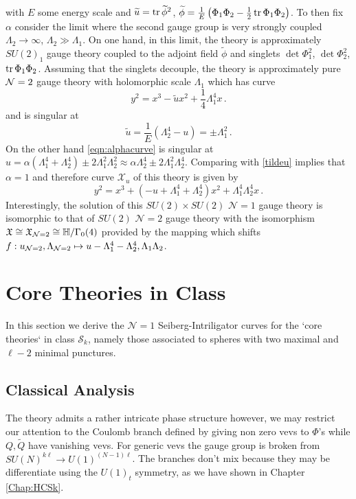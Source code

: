 \documentclass[main.tex]{subfiles}
\begin{document}
with $E$ some energy scale and $\widetilde{u}=\operatorname{tr}\widetilde{\phi}^2$, $\widetilde{\phi}=\frac{1}{E}\left(\Phi_1\Phi_2-\frac{1}{2}\operatorname{tr}\Phi_1\Phi_2\right)$. 
To then fix $\alpha$ consider the limit where the second gauge group is very strongly coupled $\Lambda_2\to\infty$, $\Lambda_2\gg\Lambda_1$. On one hand, in this limit, the theory is approximately $SU(2)_1$ gauge theory coupled to the adjoint field $\widetilde{\phi}$ and singlets $\det\Phi_1^2$, $\det\Phi_2^2$, $\operatorname{tr}\Phi_1\Phi_2$. Assuming that the singlets decouple, the theory is approximately pure $\mathcal{N}=2$ gauge theory with holomorphic scale $\Lambda_1$ which has curve
\begin{equation}
y^2=x^3-\widetilde{u}x^2+\frac{1}{4}\Lambda_1^4x\,.
\end{equation} 
and is singular at 
\begin{equation}\label{tildeu}
\widetilde{u}=\frac{1}{E}\left(\Lambda_2^4-u\right)=\pm\Lambda_1^2\,.
\end{equation}
On the other hand \eqref{eqn:alphacurve} is singular at $u=\alpha\left(\Lambda_1^4+\Lambda_2^4\right)\pm2\Lambda_1^2\Lambda_2^2\approx\alpha\Lambda_2^4\pm2\Lambda_1^2\Lambda_2^4$. Comparing with \eqref{tildeu} implies that $\alpha=1$ and therefore curve $\mathcal{X}_u$ of this theory is given by
\begin{equation}\label{eqn:SIcurve}
y^2=x^3+(-u+\Lambda^4_1+\Lambda^4_2)x^2+\Lambda^4_1\Lambda^4_2x\,.
\end{equation}
Interestingly, the solution of this $SU(2)\times SU(2)$ $\mathcal{N}=1$ gauge theory is isomorphic to that of $SU(2)$ $\mathcal{N}=2$ gauge theory with the isomorphism $\mathfrak{X}\cong\mathfrak{X}_{\mathcal{N}=2}\cong \mathbb{H}/\Gamma_0(4)$ provided by the mapping which shifts $f:u_{\mathcal{N}=2},\Lambda_{\mathcal{N}=2}\mapsto u-\Lambda_1^4-\Lambda_2^4,\Lambda_1\Lambda_2$.
\section{Core Theories in Class \texorpdfstring{\protect\Sk}{Sk}}
In this section we derive the $\mathcal{N}=1$ Seiberg-Intriligator curves for the `core theories` in class $\mathcal{S}_k$, namely those associated to spheres with two maximal and $\ell-2$ minimal punctures. 
\subsection{Classical Analysis}
The theory admits a rather intricate phase structure however, we may restrict our attention to the Coulomb branch defined by giving non zero vevs to $\Phi$'s while $Q,\widetilde{Q}$ have vanishing vevs. For generic vevs the gauge group is broken from $SU(N)^{k\ell}\to U(1)^{(N-1)\ell}$.
The branches don't mix because they may be differentiate using the $U(1)_t$ symmetry, as we have shown in Chapter \ref{Chap:HCSk}.
\end{document}
